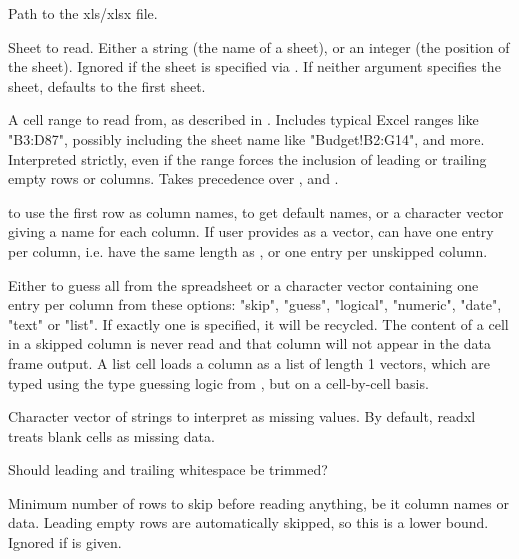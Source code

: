 \documentclass[letterpaper]{book}
\begin{document}
\begin{Arguments}
\begin{ldescription}
\item[\code{path}] Path to the xls/xlsx file.

\item[\code{sheet}] Sheet to read. Either a string (the name of a sheet), or an
integer (the position of the sheet). Ignored if the sheet is specified via
. If neither argument specifies the sheet, defaults to the first
sheet.

\item[\code{range}] A cell range to read from, as described in .
Includes typical Excel ranges like "B3:D87", possibly including the sheet
name like "Budget!B2:G14", and more. Interpreted strictly, even if the
range forces the inclusion of leading or trailing empty rows or columns.
Takes precedence over ,  and .

\item[\code{col\_names}]  to use the first row as column names,  to get
default names, or a character vector giving a name for each column. If user
provides  as a vector,  can have one entry per
column, i.e. have the same length as , or one entry per
unskipped column.

\item[\code{col\_types}] Either  to guess all from the spreadsheet or a
character vector containing one entry per column from these options:
"skip", "guess", "logical", "numeric", "date", "text" or "list". If exactly
one  is specified, it will be recycled. The content of a cell in
a skipped column is never read and that column will not appear in the data
frame output. A list cell loads a column as a list of length 1 vectors,
which are typed using the type guessing logic from , but
on a cell-by-cell basis.

\item[\code{na}] Character vector of strings to interpret as missing values. By
default, readxl treats blank cells as missing data.

\item[\code{trim\_ws}] Should leading and trailing whitespace be trimmed?

\item[\code{skip}] Minimum number of rows to skip before reading anything, be it
column names or data. Leading empty rows are automatically skipped, so this
is a lower bound. Ignored if  is given.


\end{ldescription}
\end{Arguments}
\end{document}
